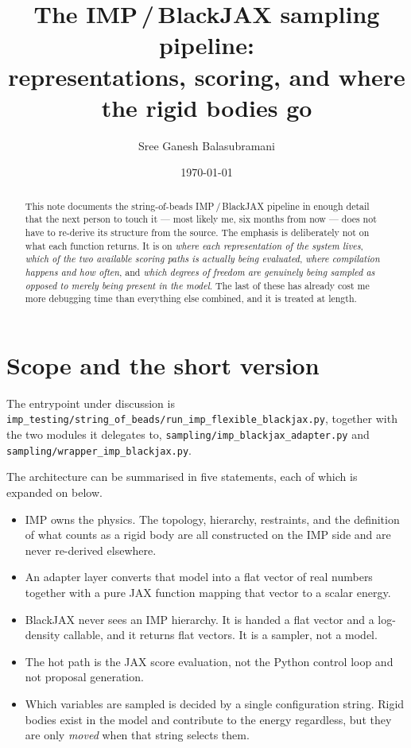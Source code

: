 \documentclass[11pt]{article}
\title{The IMP\,/\,BlackJAX sampling pipeline:\\
       representations, scoring, and where the rigid bodies go}
\author{Sree Ganesh Balasubramani}
\date{\today}
\newcommand{\code}[1]{\texttt{#1}}
\begin{document}
\maketitle

\begin{abstract}
\noindent
This note documents the string-of-beads IMP\,/\,BlackJAX pipeline in enough
detail that the next person to touch it --- most likely me, six months from now
--- does not have to re-derive its structure from the source. The emphasis is
deliberately not on what each function returns. It is on \emph{where each
representation of the system lives}, \emph{which of the two available scoring
paths is actually being evaluated}, \emph{where compilation happens and how
often}, and \emph{which degrees of freedom are genuinely being sampled as
opposed to merely being present in the model}. The last of these has already
cost me more debugging time than everything else combined, and it is treated at
length.
\end{abstract}

\section{Scope and the short version}

The entrypoint under discussion is
\code{imp\_testing/string\_of\_beads/run\_imp\_flexible\_blackjax.py},
together with the two modules it delegates to,
\code{sampling/imp\_blackjax\_adapter.py} and
\code{sampling/wrapper\_imp\_blackjax.py}.

The architecture can be summarised in five statements, each of which is
expanded on below.

\begin{itemize}[leftmargin=1.5em]
  \item IMP owns the physics. The topology, hierarchy, restraints, and the
    definition of what counts as a rigid body are all constructed on the IMP
    side and are never re-derived elsewhere.
  \item An adapter layer converts that model into a flat vector of real numbers
    together with a pure JAX function mapping that vector to a scalar energy.
  \item BlackJAX never sees an IMP hierarchy. It is handed a flat vector and a
    log-density callable, and it returns flat vectors. It is a sampler, not a
    model.
  \item The hot path is the JAX score evaluation, not the Python control loop
    and not proposal generation.
  \item Which variables are sampled is decided by a single configuration
    string. Rigid bodies exist in the model and contribute to the energy
    regardless, but they are only \emph{moved} when that string selects them.
\end{itemize}
\end{document}
